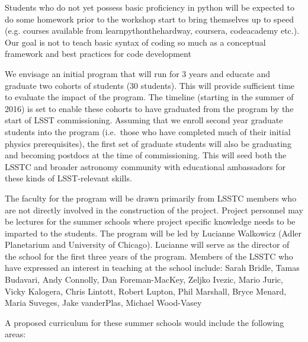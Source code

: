 \documentclass[nofootbib,floatfix,11pt]{article}
\begin{document}
Students who do not yet possess basic proficiency in python will be expected to do some homework prior to the workshop start to bring themselves up to speed (e.g. courses available from learnpythonthehardway, coursera, codeacademy etc.). Our goal is not to teach basic syntax of coding so much as a conceptual framework and best practices for code development


We envisage an initial program that will run for 3 years and educate and graduate two cohorts of students (30 students). This will provide sufficient time to evaluate the impact of the program. The timeline (starting in the summer of  2016) is set to enable these cohorts to have graduated from the program by the start of LSST commissioning. Assuming that we enroll second year graduate students into the program (i.e.\ those who have completed much of their initial physics prerequisites), the first set of graduate students will also be graduating and becoming postdocs at the time of commissioning. This will seed both the LSSTC and broader astronomy community with educational ambassadors for these kinds of LSST-relevant skills.

The faculty for the program will be drawn primarily from LSSTC members who are not directly involved in the construction of the project. Project personnel may be lectures for the summer schools where project specific knowledge needs to be imparted to the students. The program will be led by Lucianne Walkowicz (Adler Planetarium and University of Chicago). Lucianne will serve as the director of the school for the first three years of the program. Members of the LSSTC who have expressed an interest in teaching at the school include: Sarah Bridle, Tamas Budavari, Andy Connolly, Dan Foreman-MacKey, Zeljko Ivezic, Mario Juric, Vicky Kalogera, Chris Lintott, Robert Lupton, Phil Marshall, Bryce Menard, Maria Suveges, Jake vanderPlas, Michael Wood-Vasey


A proposed curriculum for these summer schools would include the following areas: 
\end{document}
